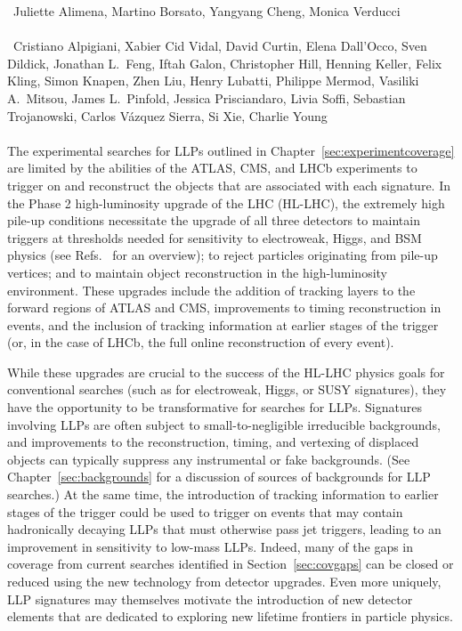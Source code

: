 ~Juliette Alimena, Martino Borsato, Yangyang Cheng, Monica Verducci\\
\text{ \; }\\
~Cristiano Alpigiani, Xabier Cid Vidal, David Curtin, Elena Dall'Occo, Sven Dildick, Jonathan L.~Feng, Iftah Galon, Christopher Hill, Henning Keller, Felix Kling, Simon Knapen, Zhen Liu, Henry Lubatti, Philippe Mermod, Vasiliki A.\ Mitsou, James L.~Pinfold, Jessica Prisciandaro, Livia Soffi, Sebastian Trojanowski, Carlos V\'azquez Sierra, Si Xie, Charlie Young\\
\text{ \; }\\

\noindent The experimental searches for LLPs outlined in Chapter~\ref{sec:experimentcoverage} are limited by the abilities of the ATLAS, CMS, and LHCb experiments to trigger on and reconstruct the objects that are associated with each signature. In the Phase 2 high-luminosity upgrade of the LHC (HL-LHC), the extremely high pile-up conditions necessitate the upgrade of all three detectors to maintain triggers at thresholds needed for sensitivity to electroweak, Higgs, and BSM physics (see Refs.~\cite{Schmidt:2016jra,Apollinari:2015bam} for an overview); to reject particles originating from pile-up vertices; and to maintain object reconstruction in the high-luminosity environment. These upgrades include the addition of tracking layers to the forward regions of ATLAS and CMS, improvements to timing reconstruction in events, and the inclusion of tracking information at earlier stages of the trigger (or, in the case of LHCb, the full online reconstruction of every event).

While these upgrades are crucial to the success of the HL-LHC physics goals for conventional searches (such as for electroweak, Higgs, or SUSY signatures), they have the opportunity to be transformative for searches for LLPs. Signatures involving LLPs are often subject to small-to-negligible irreducible backgrounds, and improvements to the reconstruction, timing, and vertexing of displaced objects can typically suppress any instrumental or fake backgrounds. (See Chapter~\ref{sec:backgrounds} for a discussion of sources of backgrounds for LLP searches.) At the same time, the introduction of tracking information to earlier stages of the trigger could be used to trigger on events that may contain hadronically decaying LLPs that must otherwise pass jet triggers, leading to an improvement in sensitivity to low-mass LLPs. Indeed, many of the gaps in coverage from current searches identified in Section~\ref{sec:covgaps} can be closed or reduced using the new technology from detector upgrades. Even more uniquely, LLP signatures may themselves motivate the introduction of new detector elements that are dedicated to exploring new lifetime frontiers in particle physics.

